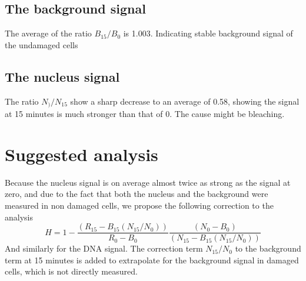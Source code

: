 \documentclass[12pt]{article}
\begin{document}
	\subsection{The background signal}
	The average of the ratio $B_{15}/B_0$ is 1.003. Indicating stable background signal of the undamaged cells
	
	\subsection{The nucleus signal}
	The ratio $N_)/N_{15}$ show a sharp decrease to an average of 0.58, showing the signal at 15 minutes is much stronger than that of 0. The cause might be bleaching. 
	
	\section{Suggested analysis}
	Because the nucleus signal is on average almost twice as strong as the signal at zero, and due to the fact that both the nucleus and the background were measured in non damaged cells, we propose the following correction to the analysis 
	\begin{equation}
	H = 1-\frac{(R_{15}-B_{15}(N_{15}/N_0))}{R_0-B_0}\frac{(N_0-B_0)}{(N_{15}-B_{15}(N_{15}/N_0))}
	\end{equation}
	And similarly for the DNA signal. The correction term $N_{15}/N_0$ to the background term at 15 minutes is added to extrapolate for the background signal in damaged cells, which is not directly measured. 
		
\end{document}
